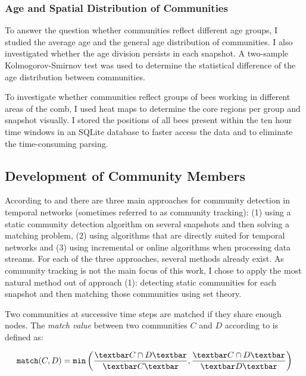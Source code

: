 


\subsubsection{Age and Spatial Distribution of Communities}
To answer the question whether communities reflect different age groups, I studied the average age and the general age distribution of communities. I also investigated whether the age division persists in each snapshot. A two-sample Kolmogorov-Smirnov test was used to determine the statistical difference of the age distribution between communities.

To investigate whether communities reflect groups of bees working in different areas of the comb, I used heat maps to determine the core regions per group and snapshot visually.
I stored the positions of all bees present within the ten hour time windows in an SQLite database to faster access the data and to eliminate the time-consuming parsing.

\subsection{Development of Community Members}
\label{sec:bg:tracking}
According to \textcite{aynaud2013communities} and  \textcite{brodka2014community} there are three main approaches for community detection in temporal networks (sometimes referred to as community tracking): (1) using a static community detection algorithm on several snapshots and then solving a matching problem, (2) using algorithms that are directly suited for temporal networks and (3) using incremental or online algorithms when processing data streams. For each of the three approaches, several methods already exist.
As community tracking is not the main focus of this work, I chose to apply the most natural method out of approach (1): detecting static communities for each snapshot and then matching those communities using set theory.

Two communities at successive time steps are matched if they share enough nodes.
The \emph{match value} between two communities $C$ and $D$ according to \textcite{hopcroft2004tracking} is defined as:

\begin{equation}
\label{eq:match}
\texttt{match}(C,D) = \texttt{min}\left( \frac{\textbar C\cap D \textbar}{\textbar C\textbar }, \frac{\textbar C\cap D \textbar}{\textbar D \textbar }\right)
\end{equation}

